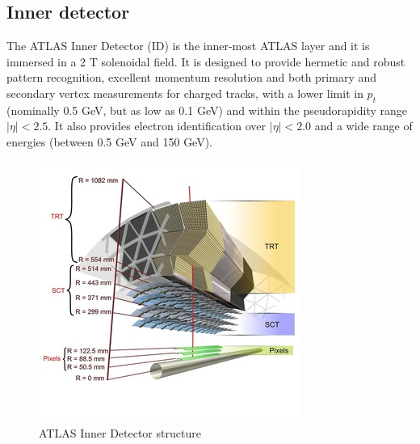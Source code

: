 \documentclass[a4paper, oneside]{book}
\begin{document}
				\subsection{Inner detector}
					\cite{ATLAS config} The ATLAS Inner Detector (ID) is the inner-most ATLAS layer and it is immersed in a 2 T solenoidal field. It is designed to provide hermetic and robust pattern recognition, excellent momentum resolution and both primary and secondary vertex measurements for charged tracks, with a lower limit in $p_t$  (nominally 0.5 GeV, but as low as 0.1 GeV) and within the pseudorapidity range $|\eta|<2.5$. It also provides electron identification over $|\eta|<2.0$ and a wide range of energies (between 0.5 GeV and 150 GeV). 
					\begin{figure}[H]
						\centering
						\includegraphics[width=0.3\textheight]{tesi_images/ID_structure.jpg}
						\caption{ATLAS Inner Detector structure}
					\end{figure}
					
\end{document}
